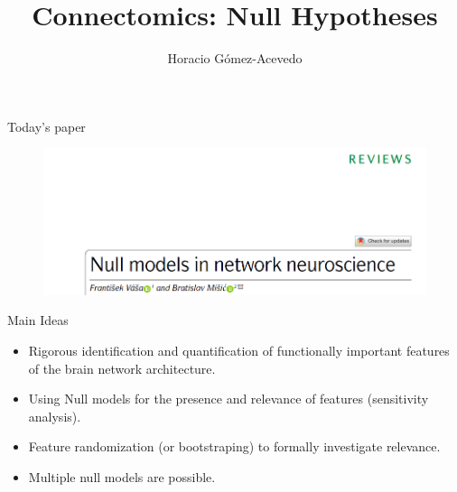 \documentclass{beamer}
\title{Connectomics: Null Hypotheses}
\author{Horacio G\'omez-Acevedo}
\begin{document}
	\begin{frame}[plain]
		\maketitle
	\end{frame}

	\begin{frame}{Today's paper}
		\begin{figure}[h]
			\centering
				\includegraphics[scale=0.45]{../Figures/fig_null_models_paper.png}
		\end{figure}
	\end{frame}
	
	
	\begin{frame}{Main Ideas}
	\begin{itemize}
		\item Rigorous identification and quantification of functionally important features of the brain network architecture.
		\item Using Null models for the presence and relevance of features (sensitivity analysis).
		\item Feature randomization (or bootstraping) to formally investigate relevance.
		\item Multiple null models are possible.
	\end{itemize}
		
	\end{frame}
	
\end{document}
